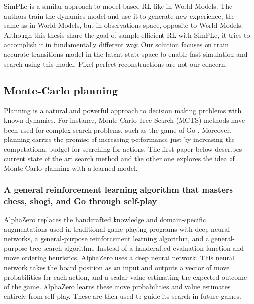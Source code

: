 SimPLe is a similar approach to model-based RL like in World Models. The authors train the dynamics model and use it to generate new experience, the same as in World Models, but in observations space, opposite to World Models. \\
Although this thesis share the goal of sample efficient RL with SimPLe, it tries to accomplish it in fundamentally different way. Our  solution focuses on train accurate transitions model in the latent state-space to enable fast simulation and search using this model. Pixel-perfect reconstructions are not our concern.

\subsection{Monte-Carlo planning}

Planning is a natural and powerful approach to decision making problems with known dynamics. For instance, Monte-Carlo Tree Search (MCTS) methods \cite{Algo.MCTS} have been used for complex search problems, such as the game of Go \cite{Algo.AlphaGoZero}. Moreover, planning carries the promise of increasing performance just by increasing the computational budget for searching for actions. The first paper below describes current state of the art search method and the other one explores the idea of Monte-Carlo planning with a learned model.

\subsubsection{A general reinforcement learning algorithm that masters chess, shogi, and Go through self-play}

AlphaZero \cite{Algo.AlphaZero} replaces the handcrafted knowledge and domain-specific augmentations used in traditional game-playing programs with deep neural networks, a general-purpose reinforcement learning algorithm, and a general-purpose tree search algorithm. Instead of a handcrafted evaluation function and move ordering heuristics, AlphaZero uses a deep neural network. This neural network takes the board position as an input and outputs a vector of move probabilities for each action, and a scalar value estimating the expected outcome of the game. AlphaZero learns these move probabilities and value estimates entirely from self-play. These are then used to guide its search in future games.

